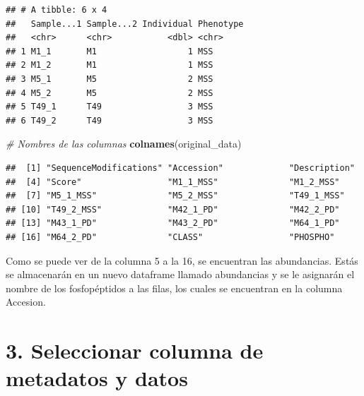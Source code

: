 \documentclass[
]{article}
\newenvironment{Shaded}{\begin{snugshade}}{\end{snugshade}}
\newcommand{\AttributeTok}[1]{\textcolor[rgb]{0.13,0.29,0.53}{#1}}
\newcommand{\CommentTok}[1]{\textcolor[rgb]{0.56,0.35,0.01}{\textit{#1}}}
\newcommand{\ConstantTok}[1]{\textcolor[rgb]{0.56,0.35,0.01}{#1}}
\newcommand{\DecValTok}[1]{\textcolor[rgb]{0.00,0.00,0.81}{#1}}
\newcommand{\FunctionTok}[1]{\textcolor[rgb]{0.13,0.29,0.53}{\textbf{#1}}}
\newcommand{\NormalTok}[1]{#1}
\newcommand{\OtherTok}[1]{\textcolor[rgb]{0.56,0.35,0.01}{#1}}
\newcommand{\SpecialCharTok}[1]{\textcolor[rgb]{0.81,0.36,0.00}{\textbf{#1}}}
\begin{document}
\begin{verbatim}
## # A tibble: 6 x 4
##   Sample...1 Sample...2 Individual Phenotype
##   <chr>      <chr>           <dbl> <chr>    
## 1 M1_1       M1                  1 MSS      
## 2 M1_2       M1                  1 MSS      
## 3 M5_1       M5                  2 MSS      
## 4 M5_2       M5                  2 MSS      
## 5 T49_1      T49                 3 MSS      
## 6 T49_2      T49                 3 MSS
\end{verbatim}

\begin{Shaded}
\begin{Highlighting}[]
\CommentTok{\# Nombres de las columnas}
\FunctionTok{colnames}\NormalTok{(original\_data)}
\end{Highlighting}
\end{Shaded}

\begin{verbatim}
##  [1] "SequenceModifications" "Accession"             "Description"          
##  [4] "Score"                 "M1_1_MSS"              "M1_2_MSS"             
##  [7] "M5_1_MSS"              "M5_2_MSS"              "T49_1_MSS"            
## [10] "T49_2_MSS"             "M42_1_PD"              "M42_2_PD"             
## [13] "M43_1_PD"              "M43_2_PD"              "M64_1_PD"             
## [16] "M64_2_PD"              "CLASS"                 "PHOSPHO"
\end{verbatim}

Como se puede ver de la columna 5 a la 16, se encuentran las
abundancias. Estás se almacenarán en un nuevo dataframe llamado
abundancias y se le asignarán el nombre de los fosfopéptidos a las
filas, los cuales se encuentran en la columna Accesion.

\section{3. Seleccionar columna de metadatos y
datos}\label{seleccionar-columna-de-metadatos-y-datos}

\begin{Shaded}
\end{Shaded}
\end{document}
